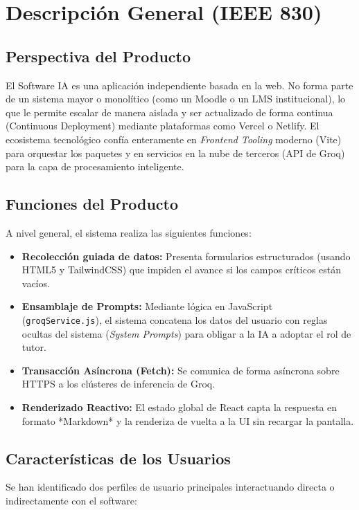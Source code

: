 \section{Descripción General (IEEE 830)}

\subsection{Perspectiva del Producto}
El Software IA es una aplicación independiente basada en la web. No forma parte de un sistema mayor o monolítico (como un Moodle o un LMS institucional), lo que le permite escalar de manera aislada y ser actualizado de forma continua (Continuous Deployment) mediante plataformas como Vercel o Netlify. El ecosistema tecnológico confía enteramente en \textit{Frontend Tooling} moderno (Vite) para orquestar los paquetes y en servicios en la nube de terceros (API de Groq) para la capa de procesamiento inteligente.

\subsection{Funciones del Producto}
A nivel general, el sistema realiza las siguientes funciones:
\begin{itemize}
    \item \textbf{Recolección guiada de datos:} Presenta formularios estructurados (usando HTML5 y TailwindCSS) que impiden el avance si los campos críticos están vacíos.
    \item \textbf{Ensamblaje de Prompts:} Mediante lógica en JavaScript (\texttt{groqService.js}), el sistema concatena los datos del usuario con reglas ocultas del sistema (\textit{System Prompts}) para obligar a la IA a adoptar el rol de tutor.
    \item \textbf{Transacción Asíncrona (Fetch):} Se comunica de forma asíncrona sobre HTTPS a los clústeres de inferencia de Groq.
    \item \textbf{Renderizado Reactivo:} El estado global de React capta la respuesta en formato *Markdown* y la renderiza de vuelta a la UI sin recargar la pantalla.
\end{itemize}

\subsection{Características de los Usuarios}
Se han identificado dos perfiles de usuario principales interactuando directa o indirectamente con el software:

